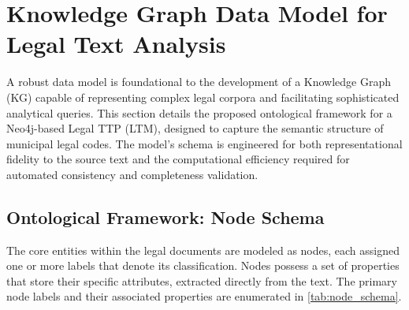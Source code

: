 \section{Knowledge Graph Data Model for Legal Text Analysis}
A robust data model is foundational to the development of a Knowledge Graph (KG) capable of representing complex legal corpora and facilitating sophisticated analytical queries. This section details the proposed ontological framework for a Neo4j-based Legal TTP (LTM), designed to capture the semantic structure of municipal legal codes. The model's schema is engineered for both representational fidelity to the source text and the computational efficiency required for automated consistency and completeness validation.

\subsection{Ontological Framework: Node Schema}
The core entities within the legal documents are modeled as nodes, each assigned one or more labels that denote its classification. Nodes possess a set of properties that store their specific attributes, extracted directly from the text. The primary node labels and their associated properties are enumerated in \cref{tab:node_schema}.

